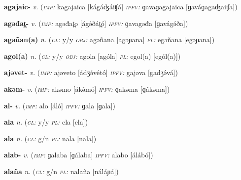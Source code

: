 \newentry
\headword\textbf{agajaic-}
\ipa{[ágáʤáiʧ-]}
\synpos\textit{v.} 
\imperative(\textit {\textsc{imp:}} kagajaica [kágáʤáiʧá] 
\imperfective\textit{\textsc{ipfv:}} ɡavaɡagajaica [ɡaváɡagaʤaiʧa])

\newentry
\headword\textbf{agəđat̪-}
\ipa{[ágə́ðát̪-]}
\synpos\textit{v.} 
\imperative(\textit {\textsc{imp:}} agəđat̪o [ágə́ðát̪ó] 
\imperfective\textit{\textsc{ipfv:}} ɡavagəđa [ɡavágə́ða])

\newentry
\headword\textbf{agəñan(a)}
\ipa{[agəɲan(a)]}
\synpos\textit{n.} 
\class(\textit{\textsc{cl:}} {y/y}
\object\textit{\textsc{obj:}} agəñana [agəɲana]
\plural\textit{\textsc{pl:}} egəñana [egəɲana])

\newentry
\headword\textbf{agol(a)}
\ipa{[agol(a)]}
\synpos\textit{n.} 
\class(\textit{\textsc{cl:}} {y/y}
\object\textit{\textsc{obj:}} agola [agóla]
\plural\textit{\textsc{pl:}} egol(a) [egól(a)])

\newentry
\headword\textbf{ajəvet-}
\ipa{[ajəvet-]}
\synpos\textit{v.} 
\imperative(\textit {\textsc{imp:}} ajəveto [ádʒə́vétó] 
\imperfective\textit{\textsc{ipfv:}} gajəva [gadʒə́vá])


\newentry
\headword\textbf{akəm-}
\ipa{[ákə́m-]}
\synpos\textit{v.} 
\imperative(\textit {\textsc{imp:}} akəmo [ákə́mó] 
\imperfective\textit{\textsc{ipfv:}} ɡakəma [ɡákəma])

\newentry
\headword\textbf{al-}
\ipa{[ál-]}
\synpos\textit{v.} 
\imperative(\textit {\textsc{imp:}} alo [áló] 
\imperfective\textit{\textsc{ipfv:}} ɡala [ɡala])

\newentry
\headword\textbf{ala}
\ipa{[ala]}
\synpos\textit{n.} 
\class(\textit{\textsc{cl:}} {y/y}
\plural\textit{\textsc{pl:}} ela [ela])

\newentry
\headword\textbf{ala}
\ipa{[ala]}
\synpos\textit{n.} 
\class(\textit{\textsc{cl:}} {g/n}
\plural\textit{\textsc{pl:}} nala [nala])
\newentry

\headword\textbf{alab-}
\ipa{[áláb-]}
\synpos\textit{v.} 
\imperative(\textit {\textsc{imp:}} ɡalaba [ɡálaba] 
\imperfective\textit{\textsc{ipfv:}} alabo [álábó])

\newentry
\headword\textbf{alaña}
\ipa{[aláɲá]}
\synpos\textit{n.} 
\class(\textit{\textsc{cl:}} {g/n}
\plural\textit{\textsc{pl:}} nalaña [náláɲá])

